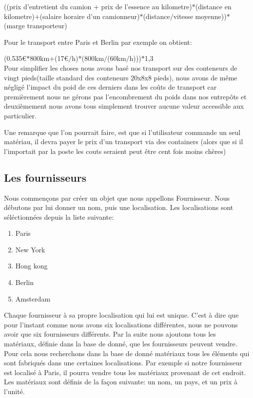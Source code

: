 ((prix d'entretient du camion + prix de l'essence au kilometre)$*$(distance en kilometre)$+$(salaire horaire d'un camionneur)$*$(distance$/$vitesse moyenne))$*$(marge transporteur)

Pour le transport entre Paris et Berlin par exemple on obtient:

(0.535€$*$800km$+$(17\euro{}$/$h)$*$(800km$/$(60km$/$h)))$*$1,3
\\

Pour simplifier les choses nous avons basé nos transport sur des conteneurs de vingt pieds(taille standard des conteneurs 20x8x8 pieds), nous avons de même négligé l’impact du poid de ces derniers dans les coûts de transport car premièrement nous ne gérons pas l’encombrement du poids dans nos entrepôts et deuxièmement nous avons tous simplement trouver aucune valeur accessible aux particulier.

Une remarque que l'on pourrait faire, est que si l'utilisateur commande un seul matériau, il devra payer le prix d'un transport via des containers (alors que si il l'importait par la poste les couts seraient peut être cent fois moins chères)


\subsection{Les fournisseurs}

Nous commençons par créer un objet que nous appellons Fournisseur. Nous débutons par lui donner un nom, puis une localisation. Les localisations sont séléctionnées depuis la liste suivante: 

\begin{enumerate}
\item[] Paris
\item[] New York
\item[] Hong kong
\item[] Berlin
\item[] Amsterdam
\end{enumerate}
Chaque fournisseur à sa propre localisation qui lui est unique. C'est à dire que pour l'instant comme nous avons six localisations différentes, nous ne pouvons avoir que six fournisseurs différents. Par la suite nous ajoutons tous les matériaux, définie dans la base de donné, que les fournisseurs peuvent vendre. Pour cela nous recherchons dans la base de donné matériaux tous les éléments qui sont fabriqués dans une certaines localisations. Par exemple si notre fournisseur est localisé à Paris, il pourra vendre tous les matériaux provenant de cet endroit. Les matériaux sont définis de la façon suivante: un nom, un pays, et un prix à l'unité.\\

